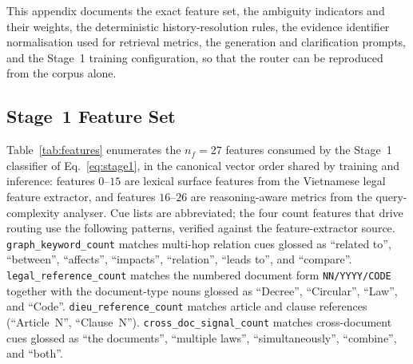 \documentclass[pdflatex,sn-mathphys-num]{sn-jnl}
\begin{document}
This appendix documents the exact feature set, the ambiguity indicators and
their weights, the deterministic history-resolution rules, the evidence
identifier normalisation used for retrieval metrics, the generation and
clarification prompts, and the Stage~1 training configuration, so that the
router can be reproduced from the corpus alone.

\subsection{Stage~1 Feature Set}\label{app:features}

Table~\ref{tab:features} enumerates the $n_f=27$ features consumed by the
Stage~1 classifier of Eq.~\eqref{eq:stage1}, in the canonical vector order
shared by training and inference: features $0$--$15$ are lexical surface
features from the Vietnamese legal feature extractor, and features
$16$--$26$ are reasoning-aware metrics from the query-complexity analyser.
Cue lists are abbreviated; the four count features that drive routing use the
following patterns, verified against the feature-extractor source.
\texttt{graph\_keyword\_count} matches multi-hop relation cues glossed as
``related to'', ``between'', ``affects'', ``impacts'', ``relation'',
``leads to'', and ``compare''. \texttt{legal\_reference\_count} matches the
numbered document form \texttt{NN/YYYY/CODE} together with the document-type
nouns glossed as ``Decree'', ``Circular'', ``Law'', and ``Code''.
\texttt{dieu\_reference\_count} matches article and clause references
(``Article~N'', ``Clause~N''). \texttt{cross\_doc\_signal\_count} matches
cross-document cues glossed as ``the documents'', ``multiple laws'',
``simultaneously'', ``combine'', and ``both''.
\end{document}
